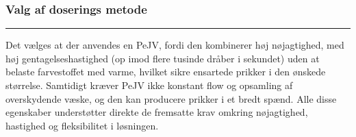 \subsubsection{Valg af doserings metode}  \plainbreak{-.5}
Det vælges at der anvendes en PeJV, fordi den kombinerer høj nøjagtighed, med høj gentagelseshastighed (op imod flere tusinde dråber i sekundet) uden at belaste farvestoffet med varme, hvilket sikre ensartede prikker i den ønskede størrelse. Samtidigt kræver PeJV ikke konstant flow og opsamling af overskydende væske, og den kan producere prikker i et bredt spænd. Alle disse egenskaber understøtter direkte de fremsatte krav omkring nøjagtighed, hastighed og fleksibilitet i løsningen. 
